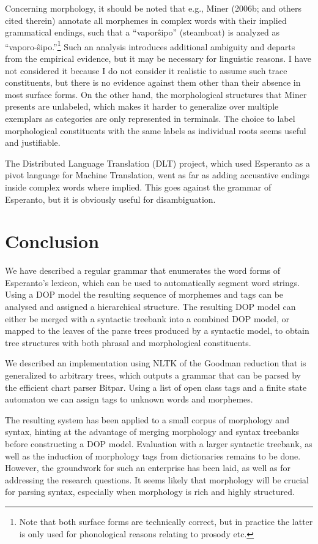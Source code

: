 \documentclass[10pt,a4paper]{article}
\begin{document}
Concerning morphology, it should be noted that e.g., Miner (2006b; and others
cited therein) annotate all morphemes in complex words with their implied
grammatical endings, such that a ``vapor\^sipo'' (steamboat) is analyzed as
``vaporo-\^sipo.''\footnote{Note that both surface forms are technically
correct, but in practice the latter is only used for phonological reasons relating to
prosody etc.} Such an analysis introduces additional ambiguity and departs from
the empirical evidence, but it may be necessary for linguistic reasons.  I have
not considered it because I do not consider it realistic to assume such trace
constituents, but there is no evidence against them other than their absence in
most surface forms. On the other hand, the morphological structures that Miner
presents are unlabeled, which makes it harder to generalize over multiple
exemplars as categories are only represented in terminals. The choice to label
morphological constituents with the same labels as individual roots seems
useful and justifiable.

The Distributed Language Translation (DLT) project, which used Esperanto as a
pivot language for Machine Translation, went as far as adding accusative
endings inside complex words where implied. This goes against the grammar of
Esperanto, but it is obviously useful for disambiguation.

\section{Conclusion}

We have described a regular grammar that enumerates the word forms of
Esperanto's lexicon, which can be used to automatically segment word strings.
Using a DOP model the resulting sequence of morphemes and tags can be analysed
and assigned a hierarchical structure. The resulting DOP model can either be
merged with a syntactic treebank into a combined DOP model, or mapped to the
leaves of the parse trees produced by a syntactic model, to obtain tree
structures with both phrasal and morphological constituents.

We described an implementation using NLTK of the Goodman reduction that is
generalized to arbitrary trees, which outputs a grammar that can be parsed by
the efficient chart parser Bitpar. Using a list of open class tags and a
finite state automaton we can assign tags to unknown words and
morphemes.

The resulting system has been applied to a small corpus of morphology and
syntax, hinting at the advantage of merging morphology and syntax treebanks
before constructing a DOP model. Evaluation with a larger syntactic treebank,
as well as the induction of morphology tags from dictionaries remains to be
done. However, the groundwork for such an enterprise has been laid, as well as
for addressing the research questions. It seems likely that morphology
will be crucial for parsing syntax, especially when morphology is rich 
and highly structured.
\end{document}
